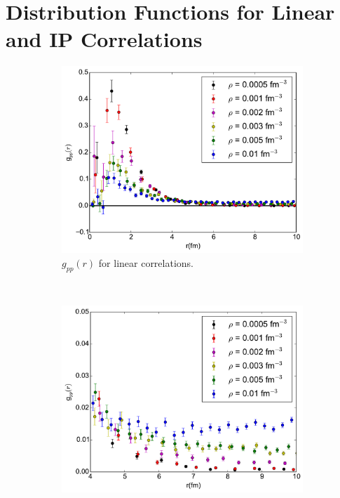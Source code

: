 \documentclass[12pt]{article}
\begin{document}
\section{Distribution Functions for Linear and IP Correlations}
\begin{figure}[h!]
   \centering
   \begin{subfigure}{0.49\textwidth}
      \includegraphics[width=\textwidth]{../gpp_lin.pdf}
      \caption{$g_{pp}(r)$ for linear correlations.}
   \end{subfigure}
   ~
   \begin{subfigure}{0.49\textwidth}
      \includegraphics[width=\textwidth]{../gpp_lin_small.pdf}

\end{subfigure}
\end{figure}
\end{document}
